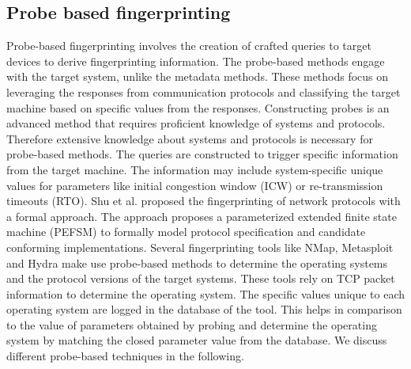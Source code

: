 \subsection{Probe based fingerprinting}
\label{Probe Based}
Probe-based fingerprinting involves the creation of crafted queries to target devices to derive fingerprinting information. The probe-based methods engage with the target system, unlike the metadata methods. These methods focus on leveraging the responses from communication protocols and classifying the target machine based on specific values from the responses. Constructing probes is an advanced method that requires proficient knowledge of systems and protocols. Therefore extensive knowledge about systems and protocols is necessary for probe-based methods. The queries are constructed to trigger specific information from the target machine. The information may include system-specific unique values for parameters like initial congestion window (ICW) or re-transmission timeouts (RTO). 
Shu et al. \cite{shu2006network} proposed the fingerprinting of network protocols with a formal approach. The approach proposes a parameterized extended finite state machine (PEFSM) to formally model protocol specification and candidate conforming implementations. Several fingerprinting tools like NMap, Metasploit and Hydra make use probe-based methods to determine the operating systems and the protocol versions of the target systems. These tools rely on TCP packet information to determine the operating system. The specific values unique to each operating system are logged in the database of the tool. This helps in comparison to the value of parameters obtained by probing and determine the operating system by matching the closed parameter value from the database. We discuss different probe-based techniques in the following.

